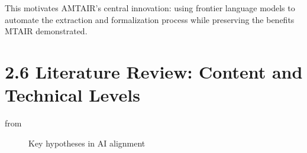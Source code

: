 \documentclass[
  11pt,
  letterpaper,
]{book}
\begin{document}
This motivates AMTAIR's central innovation: using frontier language
models to automate the extraction and formalization process while
preserving the benefits MTAIR demonstrated.

\section*{2.6 Literature Review: Content and Technical
Levels}\label{sec-literature-review}


from \textcite{cottier2019}

\begin{figure}


\caption[Key hypotheses in AI
alignment]{\label{fig-ai-hypotheses-map}Key hypotheses in AI alignment}

\end{figure}%
\end{document}
